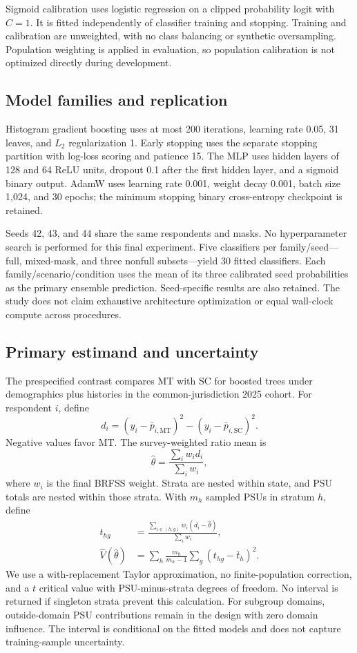 \documentclass[conference,letterpaper]{IEEEtran}
\begin{document}
Sigmoid calibration uses logistic regression on a clipped probability logit with $C=1$. It is fitted independently of classifier training and stopping. Training and calibration are unweighted, with no class balancing or synthetic oversampling. Population weighting is applied in evaluation, so population calibration is not optimized directly during development.

\subsection{Model families and replication}
Histogram gradient boosting uses at most 200 iterations, learning rate 0.05, 31 leaves, and $L_2$ regularization 1. Early stopping uses the separate stopping partition with log-loss scoring and patience 15. The MLP uses hidden layers of 128 and 64 ReLU units, dropout 0.1 after the first hidden layer, and a sigmoid binary output. AdamW uses learning rate 0.001, weight decay 0.001, batch size 1,024, and 30 epochs; the minimum stopping binary cross-entropy checkpoint is retained.

Seeds 42, 43, and 44 share the same respondents and masks. No hyperparameter search is performed for this final experiment. Five classifiers per family/seed---full, mixed-mask, and three nonfull subsets---yield 30 fitted classifiers. Each family/scenario/condition uses the mean of its three calibrated seed probabilities as the primary ensemble prediction. Seed-specific results are also retained. The study does not claim exhaustive architecture optimization or equal wall-clock compute across procedures.

\subsection{Primary estimand and uncertainty}
The prespecified contrast compares MT with SC for boosted trees under demographics plus histories in the common-jurisdiction 2025 cohort. For respondent $i$, define
\begin{equation}
 d_i=(y_i-\bar p_{i,\mathrm{MT}})^2-(y_i-\bar p_{i,\mathrm{SC}})^2.
\end{equation}
Negative values favor MT. The survey-weighted ratio mean is
\begin{equation}
 \hat\theta=\frac{\sum_i w_i d_i}{\sum_i w_i},
\end{equation}
where $w_i$ is the final BRFSS weight. Strata are nested within state, and PSU totals are nested within those strata. With $m_h$ sampled PSUs in stratum $h$, define
\begin{align}
 t_{hg}&=\frac{\sum_{i\in(h,g)}w_i(d_i-\hat\theta)}{\sum_i w_i},\\
 \widehat V(\hat\theta)&=\sum_h\frac{m_h}{m_h-1}\sum_g(t_{hg}-\bar t_h)^2.
\end{align}
We use a with-replacement Taylor approximation, no finite-population correction, and a $t$ critical value with PSU-minus-strata degrees of freedom. No interval is returned if singleton strata prevent this calculation. For subgroup domains, outside-domain PSU contributions remain in the design with zero domain influence. The interval is conditional on the fitted models and does not capture training-sample uncertainty.
\end{document}
